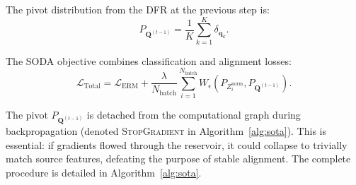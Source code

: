 \documentclass[preprint,12pt]{elsarticle}
\begin{document}
The pivot distribution from the DFR at the previous step is:
\begin{equation}
    P_{\mathbf{Q}^{(t-1)}} = \frac{1}{K} \sum_{k=1}^{K} \delta_{\mathbf{q}_k}.
\end{equation}

The SODA objective combines classification and alignment losses:
\begin{equation}
    \label{eq:soda_final_objective}
    \mathcal{L}_{\text{Total}} = \mathcal{L}_{\text{ERM}} + \frac{\lambda}{N_{\text{batch}}} \sum_{i=1}^{N_{\text{batch}}} W_\epsilon\left(P_{Z_i^{\text{norm}}}, P_{\mathbf{Q}^{(t-1)}}\right).
\end{equation}

The pivot $P_{\mathbf{Q}^{(t-1)}}$ is detached from the computational graph during backpropagation (denoted \textsc{StopGradient} in Algorithm~\ref{alg:sota}). This is essential: if gradients flowed through the reservoir, it could collapse to trivially match source features, defeating the purpose of stable alignment. The complete procedure is detailed in Algorithm~\ref{alg:sota}.
\end{document}

